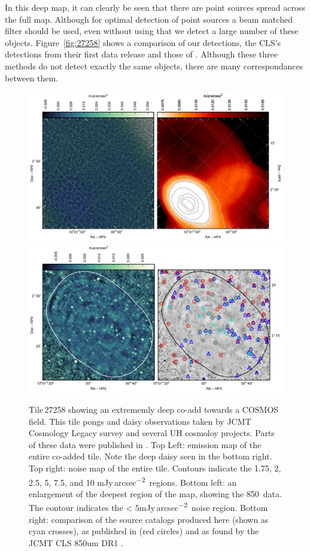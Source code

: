\documentclass[twocolumn,times]{aastex6}
\newcommand{\jyas}{Jy\,arcsec\textsuperscript{$-$2}}
\begin{document}
In this deep map, it can clearly be seen that there are point sources
spread across the full map. Although for optimal detection of point
sources a beam matched filter should be used, even without using that
we detect a large number of these objects. Figure~\ref{fig:27258}
shows a comparison of our detections, the CLS's detections from their
first data release \citep{Geach2016} and those of
\citet{Casey2013}. Although these three methods do not detect exactly the
same objects, there are many correspondances between them.

\begin{figure}
  \includegraphics{27258-whole-map.pdf}
  \\[3mm]
  \includegraphics{27258-zoomin.pdf}
  \caption{Tile\,27258 showing an extrememly deep co-add towards a
    COSMOS field. This tile pongs and daisy observations taken by JCMT
    Cosmology Legacy survey and several UH cosmoloy projects. Parts of
    these data were published in
    \citet{Casey2013,Chen2013,Chen2013a,Geach2016}. Top Left: emission
    map of the entire co-added tile. Note the deep daisy seen in the
    bottom right. Top right: noise map of the entire tile. Contours
    indicate the 1.75, 2, 2.5, 5, 7.5, and 10 m\jyas\ regions. Bottom
    left: an enlargement of the deepest region of the map, showing the
    850\micron\ data. The contour indicates the < 5m\jyas\ noise
    region. Bottom right: comparison of the source catalogs produced
    here (shown as cyan crosses), as published in \citealt{Casey2013}
    (red circles) and as found by the JCMT CLS 850um DR1 \citep[blue
    triangles]{Geach2016}. }
  \label{fig:t27258}
\end{figure}
\end{document}
